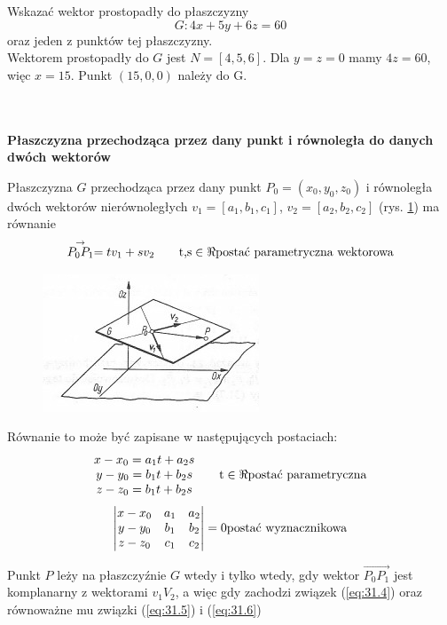 \begin{przyklad}{31.2}
Wskazać wektor prostopadły do płaszczyzny
\begin{equation}
	G:4x + 5y + 6z = 60 \nonumber
\end{equation}
oraz jeden z punktów tej płaszczyzny.\\
Wektorem prostopadły do $G$ jest $N = [4, 5, 6]$. Dla $y = z = 0$ mamy $4z = 60$, więc $x = 15$. Punkt $(15, 0, 0)$ należy do G.
\end{przyklad}
\\ \\
\textbf{Płaszczyzna przechodząca przez dany punkt i równoległa do danych dwóch wektorów}
\begin{pkt}{31.2}
Płaszczyzna $G$ przechodząca przez dany punkt $P_0 = (x_0, y_0, z_0)$ i równoległa dwóch wektorów nierównoległych $v_1 = [a_1, b_1, c_1]$, $v_2 = [a_2, b_2, c_2]$ (rys. \ref{fig:31.2}) ma równanie
\begin{equation}
	\stackrel{\rightarrow}{P_0P_1} = tv_1+sv_2 \qquad	\textrm{t,s} \in \Re \hfill \textrm{postać parametryczna wektorowa}
	\label{eq:31.4}
\end{equation}
\begin{figure}[ht]
	\centering
		\includegraphics{rys/31_2.png}
	\caption{ }
	\label{fig:31.2}
\end{figure}
Równanie to może być zapisane w następujących postaciach:
\begin{equation}
	\begin{matrix}
	x - x_0 = a_1t+a_2s\\
	y - y_0 = b_1t+b_2s\\
	z - z_0 = b_1t+b_2s\\
	\end{matrix}
	\qquad	\textrm{t} \in \Re \hfill \textrm{postać parametryczna}\\
	\label{eq:31.5}
\end{equation}
\begin{equation}
	\begin{vmatrix}
		x - x_0 & a_1 & a_2\\
		y - y_0 & b_1 & b_2\\
		z - z_0 & c_1 & c_2\\
	\end{vmatrix}
	= 0 \hfill	\textrm{postać wyznacznikowa}
	\label{eq:31.6}
\end{equation}
\end{pkt}
\begin{dowod}
Punkt $P$ leży na płaszczyźnie $G$ wtedy i tylko wtedy, gdy wektor $\stackrel{\rightarrow}{P_0P_1}$ jest komplanarny z wektorami $v_1V_2$, a więc gdy zachodzi związek (\ref{eq:31.4}) oraz równoważne mu związki (\ref{eq:31.5}) i (\ref{eq:31.6})
\end{dowod}

